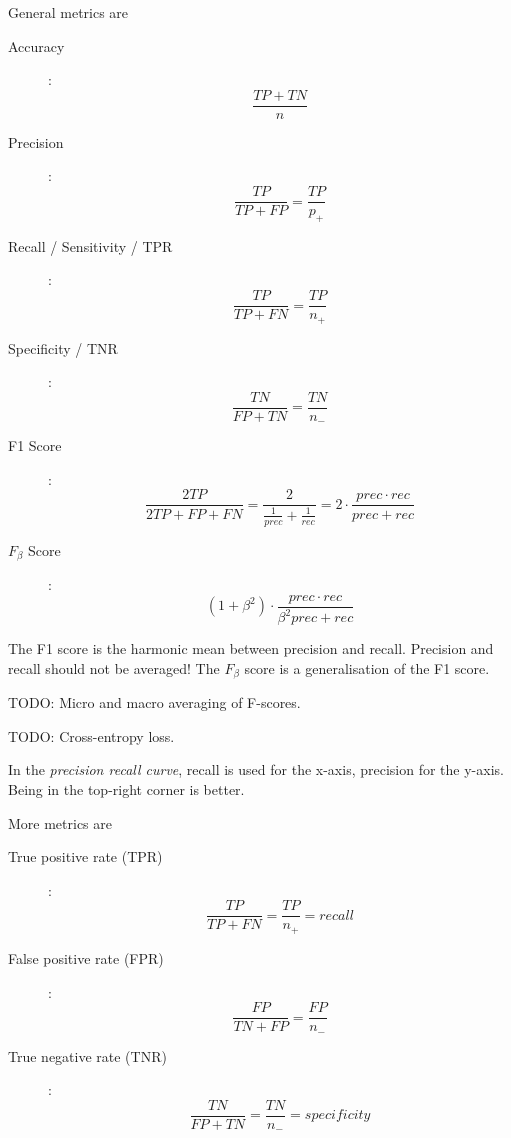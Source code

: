 General metrics are
\begin{description}
	\item[Accuracy]: \begin{equation*}
	\frac{TP + TN}{n}
	\end{equation*}
	\item[Precision]: \begin{equation*}
	\frac{TP}{TP + FP} = \frac{TP}{p_{+}}
	\end{equation*}
	\item[Recall / Sensitivity / TPR]: \begin{equation*}
	\frac{TP}{TP + FN} = \frac{TP}{n_{+}}
	\end{equation*}
	\item[Specificity / TNR]: \begin{equation*}
	\frac{TN}{FP + TN} = \frac{TN}{n_{-}}
	\end{equation*}
	\item[F1 Score]: \begin{equation*}
	\frac{2TP}{2TP + FP + FN} = \frac{2}{\frac{1}{prec} + \frac{1}{rec}} = 2 \cdot \frac{prec \cdot rec}{prec + rec}
	\end{equation*}
	\item[$F_\beta$ Score]: \begin{equation*}
	(1 + \beta^2) \cdot \frac{prec \cdot rec}{\beta^2 prec + rec}
	\end{equation*}
\end{description}
The F1 score is the
harmonic mean between precision and recall.
Precision and recall should not be averaged!
The $F_\beta$ score is a generalisation of the
F1 score.

TODO: Micro and macro averaging of F-scores.

TODO: Cross-entropy loss.

In the \emph{precision recall curve},
recall is used for the x-axis, precision for the y-axis.
Being in the top-right corner is better.

More metrics are
\begin{description}
	\item[True positive rate (TPR)]: \begin{equation*}
	\frac{TP}{TP + FN} = \frac{TP}{n_{+}} = recall
	\end{equation*}
	\item[False positive rate (FPR)]: \begin{equation*}
	\frac{FP}{TN + FP} = \frac{FP}{n_{-}}
	\end{equation*}
	\item[True negative rate (TNR)]: \begin{equation*}
	\frac{TN}{FP + TN} = \frac{TN}{n_{-}} = specificity
	\end{equation*}
\end{description}

